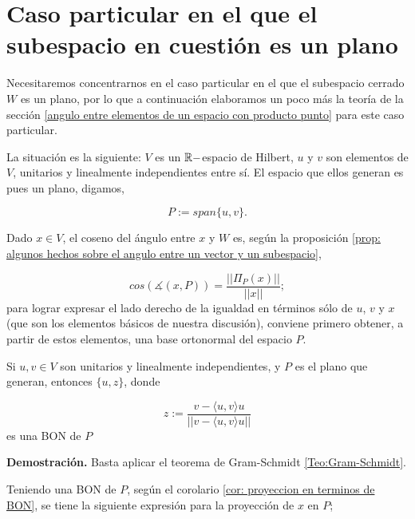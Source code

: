 \section{Caso particular en el que el subespacio en cuestión es un plano}
\label{ap: Caso particular en el que el subespacio en cuestión es un plano}

Necesitaremos concentrarnos en el caso
particular en el que el subespacio cerrado $W$ es 
un plano, por lo que a continuación elaboramos un poco más
la teoría de la sección 
\ref{angulo entre elementos de un espacio con producto punto}
para este caso particular.

La situación es la siguiente: $V$ es un $\mathbb{R}-$espacio
de Hilbert, $u$ y $v$ son elementos de $V$,
unitarios y linealmente
independientes entre sí. El espacio que ellos generan
es pues un plano, digamos,


\[
P := span \{ u, v \}.
\]

Dado $x \in V$,
el coseno del ángulo entre $x$ y $W$ es,
según la proposición
\ref{prop: algunos hechos sobre el angulo entre un vector y un subespacio},

\begin{equation}
\label{eq0: 19Marzo}
cos \left( \measuredangle (x, P) \right) = 
\frac{|| \Pi_{P}(x) ||}{||x||};
\end{equation}
para lograr expresar el lado derecho de la igualdad en términos
sólo de $u$, $v$ y $x$ (que son los elementos básicos de
nuestra discusión), conviene primero obtener, a partir 
de estos elementos, una base
ortonormal del espacio $P$.


\begin{obs}
Si $u, v \in V$ son unitarios y linealmente independientes, y $P$
es el plano que generan, entonces
$\{ u, z \}$, donde

\begin{equation}
\label{eq2: 19Marzo}
z:= \frac{v- \langle u, v \rangle u}{||v- \langle u, v \rangle u||}
\end{equation}
es una BON de $P$
\end{obs}
\noindent
\textbf{Demostración.}
Basta aplicar el teorema de Gram-Schmidt 
\ref{Teo:Gram-Schmidt}.
\QEDB
\vspace{0.2cm}

Teniendo una BON de $P$, según el 
corolario 
\ref{cor: proyeccion en terminos de BON}, se tiene la siguiente
expresión para la proyección de $x$ en $P$;


